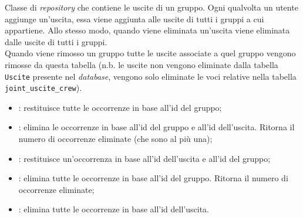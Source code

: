 Classe di \textit{repository} che contiene le uscite di un gruppo. Ogni
qualvolta un utente aggiunge un'uscita, essa viene aggiunta alle uscite di
tutti i gruppi a cui appartiene. Allo stesso modo, quando viene eliminata
un'uscita
viene eliminata dalle uscite di tutti i gruppi.\\
Quando viene rimosso un gruppo tutte
le uscite associate a quel gruppo vengono rimosse da questa tabella (n.b. le
uscite non vengono eliminate dalla tabella \texttt{Uscite} presente nel
\textit{database}, vengono solo eliminate le voci relative nella tabella
\texttt{joint\_uscite\_crew}).
\begin{itemize}
    \item {}:
          restituisce tutte le occorrenze in base all'id del gruppo;
    \item {}:
          elimina le occorrenze in base all'id del gruppo e all'id dell'uscita.
          Ritorna
          il numero di occorrenze eliminate (che sono al più una);
    \item {}: restituisce un'occorrenza in base all'id dell'uscita e
          all'id del
          gruppo;
    \item {}: elimina tutte le occorrenze
          in base all'id del gruppo. Ritorna il numero di occorrenze eliminate;
    \item {}: elimina tutte le
          occorrenze in base all'id dell'uscita.
\end{itemize}

